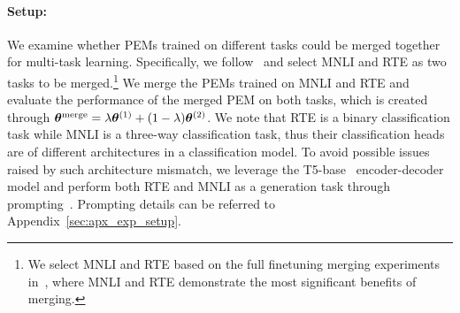 \paragraph{Setup:}
We examine whether PEMs trained on different tasks could be merged together for multi-task learning. 
Specifically, we follow~\citet{matena2022merging} and select MNLI and RTE as two tasks to be merged.\footnote{We select MNLI and RTE based on the full finetuning merging experiments in~\citet{matena2022merging}, where MNLI and RTE demonstrate the most significant benefits of merging.} 
We merge the PEMs trained on MNLI and RTE and evaluate the performance of the merged PEM on both tasks, which is created through ${\bm{\theta}}^{\text{merge}} = \lambda{\bm{\theta}}^{(1)} + (1-\lambda){\bm{\theta}}^{(2)}$. 
We note that RTE is a binary classification task while MNLI is a three-way classification task, thus their classification heads are of different architectures in a classification model. 
To avoid possible issues raised by such architecture mismatch, we leverage the T5-base~\citep{raffel2020exploring} encoder-decoder model and perform both RTE and MNLI as a generation task through prompting~\citep{liu2023pre}. 
Prompting details can be referred to Appendix~\ref{sec:apx_exp_setup}.



